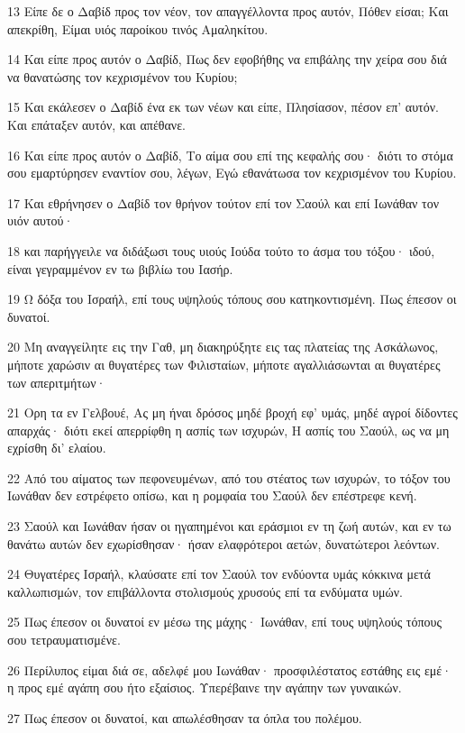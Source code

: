 \par 13 Είπε δε ο Δαβίδ προς τον νέον, τον απαγγέλλοντα προς αυτόν, Πόθεν είσαι; Και απεκρίθη, Είμαι υιός παροίκου τινός Αμαληκίτου.
\par 14 Και είπε προς αυτόν ο Δαβίδ, Πως δεν εφοβήθης να επιβάλης την χείρα σου διά να θανατώσης τον κεχρισμένον του Κυρίου;
\par 15 Και εκάλεσεν ο Δαβίδ ένα εκ των νέων και είπε, Πλησίασον, πέσον επ' αυτόν. Και επάταξεν αυτόν, και απέθανε.
\par 16 Και είπε προς αυτόν ο Δαβίδ, Το αίμα σου επί της κεφαλής σου· διότι το στόμα σου εμαρτύρησεν εναντίον σου, λέγων, Εγώ εθανάτωσα τον κεχρισμένον του Κυρίου.
\par 17 Και εθρήνησεν ο Δαβίδ τον θρήνον τούτον επί τον Σαούλ και επί Ιωνάθαν τον υιόν αυτού·
\par 18 και παρήγγειλε να διδάξωσι τους υιούς Ιούδα τούτο το άσμα του τόξου· ιδού, είναι γεγραμμένον εν τω βιβλίω του Ιασήρ.
\par 19 Ω δόξα του Ισραήλ, επί τους υψηλούς τόπους σου κατηκοντισμένη. Πως έπεσον οι δυνατοί.
\par 20 Μη αναγγείλητε εις την Γαθ, μη διακηρύξητε εις τας πλατείας της Ασκάλωνος, μήποτε χαρώσιν αι θυγατέρες των Φιλισταίων, μήποτε αγαλλιάσωνται αι θυγατέρες των απεριτμήτων·
\par 21 Ορη τα εν Γελβουέ, Ας μη ήναι δρόσος μηδέ βροχή εφ' υμάς, μηδέ αγροί δίδοντες απαρχάς· διότι εκεί απερρίφθη η ασπίς των ισχυρών, Η ασπίς του Σαούλ, ως να μη εχρίσθη δι' ελαίου.
\par 22 Από του αίματος των πεφονευμένων, από του στέατος των ισχυρών, το τόξον του Ιωνάθαν δεν εστρέφετο οπίσω, και η ρομφαία του Σαούλ δεν επέστρεφε κενή.
\par 23 Σαούλ και Ιωνάθαν ήσαν οι ηγαπημένοι και εράσμιοι εν τη ζωή αυτών, και εν τω θανάτω αυτών δεν εχωρίσθησαν· ήσαν ελαφρότεροι αετών, δυνατώτεροι λεόντων.
\par 24 Θυγατέρες Ισραήλ, κλαύσατε επί τον Σαούλ τον ενδύοντα υμάς κόκκινα μετά καλλωπισμών, τον επιβάλλοντα στολισμούς χρυσούς επί τα ενδύματα υμών.
\par 25 Πως έπεσον οι δυνατοί εν μέσω της μάχης· Ιωνάθαν, επί τους υψηλούς τόπους σου τετραυματισμένε.
\par 26 Περίλυπος είμαι διά σε, αδελφέ μου Ιωνάθαν· προσφιλέστατος εστάθης εις εμέ· η προς εμέ αγάπη σου ήτο εξαίσιος. Υπερέβαινε την αγάπην των γυναικών.
\par 27 Πως έπεσον οι δυνατοί, και απωλέσθησαν τα όπλα του πολέμου.

